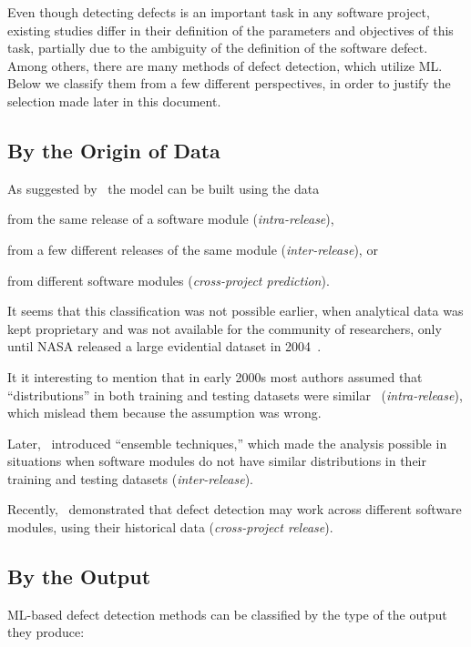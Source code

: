 Even though detecting defects is an important task in any software project,
existing studies differ in their definition of the parameters and objectives
of this task,
partially due to the ambiguity of the definition of the software defect.
Among others, there are many methods of defect detection, which utilize ML. 
Below we classify them from a few different perspectives, 
in order to justify the selection made later in this document.

\subsection{By the Origin of Data}

As suggested by~\citet{10.1007/s10462-017-9563-5}
the model can be built using the data 
\begin{enumerate*}[label=\arabic*)]
\item from the same release of a software module (\emph{intra-release}), 
\item from a few different releases of the same module (\emph{inter-release}), or 
\item from different software modules (\emph{cross-project prediction}). 
\end{enumerate*}
It seems that this classification was not possible earlier,
when analytical data was kept proprietary and was not available
for the community of researchers, only until NASA released a large 
evidential dataset in 2004~\citep{Sayyad-Shirabad+Menzies:2005}.

It it interesting to mention that
in early 2000s most authors assumed that ``distributions'' in both 
training and testing datasets were similar~\citep{Turhan2009} (\emph{intra-release}), which
mislead them because the assumption was wrong.

Later,~\citet{5609530} introduced ``ensemble techniques,'' which made the analysis
possible in situations when software modules do not have similar 
distributions in their training and testing datasets (\emph{inter-release}).

Recently,~\citet{Better_cross} demonstrated that defect detection may work across 
different software modules, using their historical data (\emph{cross-project release}).

\subsection{By the Output}

ML-based defect detection methods can be classified by the type of the output they produce:

